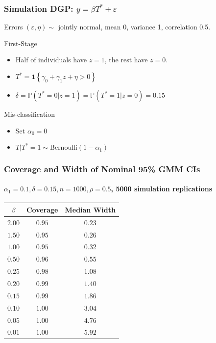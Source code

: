 \documentclass{beamer}
\begin{document}
\begin{frame}
  \frametitle{Simulation DGP: $y = \beta T^* + \varepsilon$}
  \begin{block}{Errors}
      $(\varepsilon, \eta) \sim $ jointly normal, mean 0, variance 1, correlation 0.5.
  \end{block}
  \begin{block}{First-Stage}
      \begin{itemize}
        \item Half of individuals have $z=1$, the rest have $z=0$.
        \item $T^* = \mathbf{1}\left\{ \gamma_0 + \gamma_1 z + \eta > 0 \right\}$
        \item $\delta = \mathbb{P}(T^* = 0|z =1) = \mathbb{P}(T^*=1|z=0) = 0.15$
      \end{itemize}
  \end{block}
  \vspace{-1em}


  \begin{block}{Mis-classification}
      \begin{itemize}
        \item Set $\alpha_0 = 0$ 
        \item $T|T^*=1 \sim \mbox{Bernoulli}(1-\alpha_1)$
      \end{itemize}
  \end{block}
  
\end{frame}
\begin{frame}
  \frametitle{Coverage and Width of Nominal 95\% GMM CIs}
  \framesubtitle{$\alpha_1 = 0.1, \delta = 0.15, n = 1000, \rho = 0.5$, 5000 simulation replications}
\begin{table}[!tbp]
  \small
\centering
\begin{tabular}{ccc}
\hline\hline
$\beta$ & Coverage & Median Width \\
\hline
$2.00$&$0.95$&$0.23$\tabularnewline
$1.50$&$0.95$&$0.26$\tabularnewline
$1.00$&$0.95$&$0.32$\tabularnewline
$0.50$&$0.96$&$0.55$\tabularnewline
$0.25$&$0.98$&$1.08$\tabularnewline
$0.20$&$0.99$&$1.40$\tabularnewline
$0.15$&$0.99$&$1.86$\tabularnewline
$0.10$&$1.00$&$3.04$\tabularnewline
$0.05$&$1.00$&$4.76$\tabularnewline
$0.01$&$1.00$&$5.92$\tabularnewline
\hline
\end{tabular}
\end{table}
\end{frame}
\end{document}
